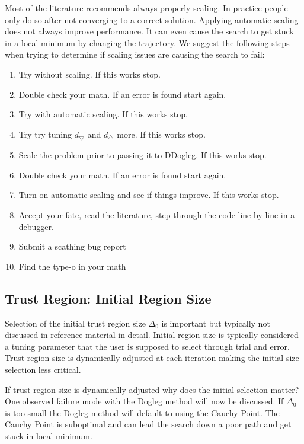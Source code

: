 \documentclass[peerreview,onecolumn]{IEEEtran}
\newenvironment{enumargin}[1]{\begin{enumerate}[leftmargin=#1\textwidth , rightmargin=#1\textwidth]}{\end{enumerate}}
\begin{document}
Most of the literature recommends always properly scaling. In practice people only do so after not converging to a correct solution. Applying automatic scaling does not always improve performance. It can even cause the search to get stuck in a local minimum by changing the trajectory. We suggest the following steps when trying to determine if scaling issues are causing the search to fail:
\begin{enumargin}{0.2}
\item Try without scaling. If this works stop.
\item Double check your math. If an error is found start again.
\item Try with automatic scaling. If this works stop.
\item Try try tuning $d_{\bigtriangledown}$ and $d_{\bigtriangleup}$ more. If this works stop.
\item Scale the problem prior to passing it to DDogleg. If this works stop.
\item Double check your math. If an error is found start again.
\item Turn on automatic scaling and see if things improve. If this works stop.
\item Accept your fate, read the literature, step through the code line by line in a debugger.
\item Submit a scathing bug report
\item Find the type-o in your math
\end{enumargin}

\subsection{Trust Region: Initial Region Size} 
\label{section:init_region_size}

Selection of the initial trust region size $\Delta_0$ is important but typically not discussed in reference material \cite{fletcher1987,numopt2006,IMM2004} in detail. Initial region size is typically considered a tuning parameter that the user is supposed to select through trial and error. Trust region size is dynamically adjusted at each iteration making the initial size selection less critical. 

If trust region size is dynamically adjusted why does the initial selection matter? One observed failure mode with the Dogleg method will now be discussed. If $\Delta_0$ is too small the Dogleg method will default to using the Cauchy Point. The Cauchy Point is suboptimal and can lead the search down a poor path and get stuck in local minimum. 
\end{document}
